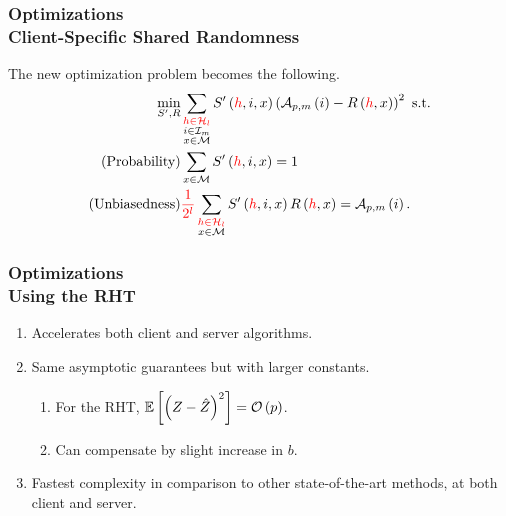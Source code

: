 \documentclass{beamer}
\begin{document}
    \begin{frame}
        \frametitle{Optimizations\\\small Client-Specific Shared Randomness}
        The new optimization problem becomes the following.
        \begin{align}
            \min_{S^\prime,R} &\sum_{\substack{\textcolor{red}{h\in\mathcal H_l}\\i\in\mathcal I_m\\x\in\mathcal M}}S^\prime\left(\textcolor{red}{h},i,x\right)\left(\mathcal A_{p,m}\left(i\right) - R\left(\textcolor{red}{h},x\right)\right)^2 \text{ s.t.} \\
            \text{(Probability)} &\sum_{x\in\mathcal M}S^\prime\left(\textcolor{red}{h},i,x\right) = 1 \\
            \text{(Unbiasedness)} &\textcolor{red}{\frac{1}{2^l}}\sum_{\substack{\textcolor{red}{h\in\mathcal H_l}\\x\in\mathcal M}}S^\prime\left(\textcolor{red}{h},i,x\right)R\left(\textcolor{red}{h},x\right) = \mathcal A_{p,m}\left(i\right).
            \label{eq:opt-quic-fl-rand}
        \end{align}
    \end{frame}

    \begin{frame}
        \frametitle{Optimizations\\\small Using the RHT}    
        \begin{enumerate}
            \item Accelerates both client and server algorithms.
            \item Same asymptotic guarantees but with larger constants. 
            \begin{enumerate}
                \item For the RHT, \(\mathbb{E}\left[ \left(Z-\hat{Z}\right)^2 \right] = \mathcal O\left(p\right)\).
                \item Can compensate by slight increase in \(b\).
            \end{enumerate}
            \item Fastest complexity in comparison to other state-of-the-art
            methods, at both client and server.
        \end{enumerate}
    \end{frame}
    
\end{document}
